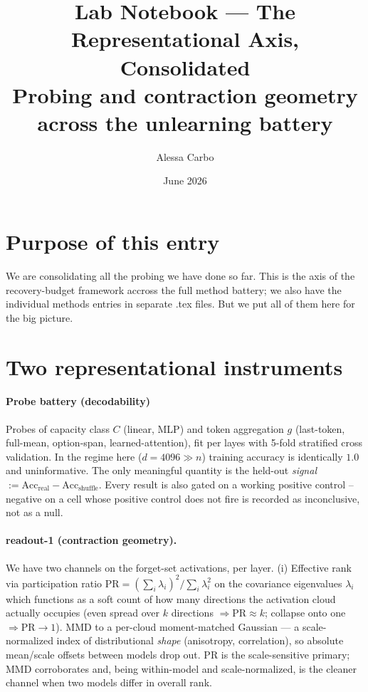 \documentclass[11pt]{article}
\title{Lab Notebook --- The Representational Axis, Consolidated\\
\large Probing and contraction geometry across the unlearning battery}
\author{Alessa Carbo}
\date{June 2026}
\newcommand{\Acc}{\mathrm{Acc}}
\newcommand{\PR}{\mathrm{PR}}
\begin{document}
\maketitle

\section{Purpose of this entry}
We are consolidating all the probing we have done so far. 
This is the axis of the recovery-budget framework accross the full method battery; we also have the individual methods entries in separate .tex files. But we put all of them here for the big picture. 

\section{Two representational instruments}


\paragraph{Probe battery (decodability)}
Probes of capacity class $C$ (linear, MLP) and token aggregation $g$ (last-token, full-mean, option-span, learned-attention), fit per layes with 5-fold stratified cross validation. In the regime here ($d=4096 \gg n$) training accuracy is identically  $1.0$ and uninformative. The only meaningful quantity is the held-out \emph{signal} $:=\Acc_{\text{real}}-\Acc_{\text{shuffle}}$. Every result is also gated on a working positive control -- negative on a cell whose positive control does not fire is recorded as inconclusive, not as a null.

\paragraph{readout-1 (contraction geometry).} 
We have two channels on the forget-set activations, per layer. (i) Effective rank via participation ratio 
$\PR = (\sum_i\lambda_i)^2 / \sum_i\lambda_i^2$ on the covariance eigenvalues
$\lambda_i$ which functions as a soft count of how many directions the activation cloud actually occupies
(even spread over $k$ directions $\Rightarrow \PR\approx k$; collapse onto one $\Rightarrow \PR\to 1$). MMD to a per-cloud moment-matched Gaussian --- a
scale-normalized index of distributional \emph{shape} (anisotropy, correlation), so
absolute mean/scale offsets between models drop out. PR is the scale-sensitive primary;
MMD corroborates and, being within-model and scale-normalized, is the cleaner channel when
two models differ in overall rank.
\end{document}
